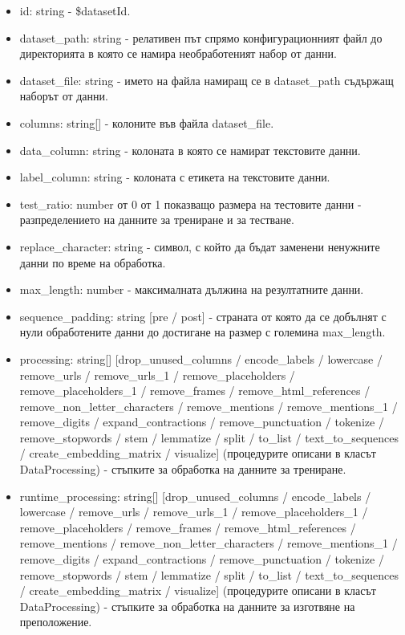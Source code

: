\documentclass{article}
\begin{document}
\begin{itemize}
\begin{itemize}
\begin{itemize}
                \item id: string - \$datasetId.
                \item dataset\_path: string - релативен път спрямо конфигурационният файл до директорията в която се намира
                необработеният набор от данни.
                \item dataset\_file: string - името на файла намиращ се в dataset\_path съдържащ наборът от данни.
                \item columns: string[] - колоните във файла dataset\_file.
                \item data\_column: string - колоната в която се намират текстовите данни.
                \item label\_column: string - колоната с етикета на текстовите данни.
                \item test\_ratio: number от 0 от 1 показващо размера на тестовите данни - разпределението на данните за
                трениране и за тестване.
                \item replace\_character: string - символ, с който да бъдат заменени ненужните данни по време на обработка.
                \item max\_length: number - максималната дължина на резултатните данни.
                \item sequence\_padding: string [pre / post] - страната от която да се добълнят с нули обработените данни до
                достигане на размер с големина max\_length.
                \item processing: string[] [drop\_unused\_columns / encode\_labels / lowercase / remove\_urls /
                remove\_urls\_1 / remove\_placeholders / remove\_placeholders\_1 / remove\_frames / remove\_html\_references /
                remove\_non\_letter\_characters / remove\_mentions / remove\_mentions\_1 / remove\_digits /
                expand\_contractions / remove\_punctuation / tokenize / remove\_stopwords / stem / lemmatize / split /
                to\_list / text\_to\_sequences / create\_embedding\_matrix / visualize] (процедурите описани в класът
                DataProcessing) - стъпките за обработка на данните за трениране.
                \item runtime\_processing: string[] [drop\_unused\_columns / encode\_labels / lowercase / remove\_urls /
                remove\_urls\_1 / remove\_placeholders\_1 / remove\_placeholders / remove\_frames / remove\_html\_references /
                remove\_mentions / remove\_non\_letter\_characters / remove\_mentions\_1 / remove\_digits /
                expand\_contractions / remove\_punctuation / tokenize / remove\_stopwords / stem / lemmatize / split /
                to\_list / text\_to\_sequences / create\_embedding\_matrix / visualize] (процедурите описани в класът DataProcessing) - стъпките за обработка на данните за
                изготвяне на преположение.


\end{itemize}
\end{itemize}
\end{itemize}
\end{document}

